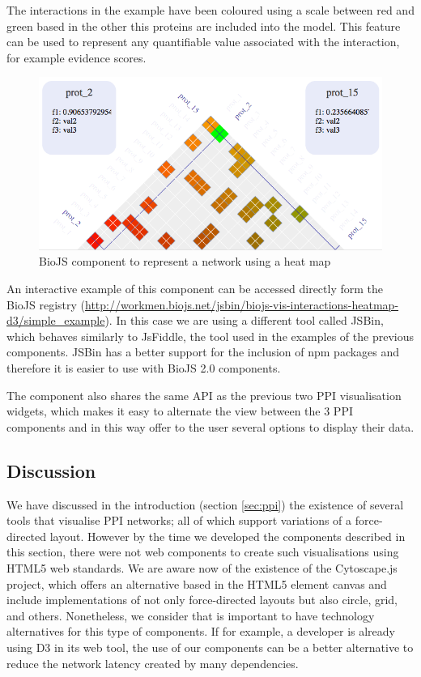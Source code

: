 The interactions in the example have been coloured using a scale between red and green based in the other this proteins are included into the model. This feature can be used to represent any quantifiable value associated with the interaction, for example evidence scores.

\begin{figure}[ht]
\centering
\includegraphics[width=\textwidth]{figures/heatmap.png}
\caption[BioJS component to represent a network using a heat map]{BioJS component to represent a network using a heat map
\label{fig:biojs_heatmap}}
\end{figure}

An interactive example of this component can be accessed directly form the BioJS registry (\url{http://workmen.biojs.net/jsbin/biojs-vis-interactions-heatmap-d3/simple_example}). In this case we are using a different tool called JSBin, which behaves similarly to JsFiddle, the tool used in the examples of the previous components. JSBin has a better support for the inclusion of npm packages and therefore it is easier to use with BioJS 2.0 components.

The component also shares the same API as the previous two PPI visualisation widgets, which makes it easy to alternate the view between the 3 PPI components and in this way offer to the user several options to display their data.


\subsection{Discussion}
We have discussed in the introduction (section \ref{sec:ppi}) the existence of several tools that visualise PPI networks; all of which support variations of a force-directed layout. However by the time we developed the components described in this section, there were not web components to create such visualisations using HTML5 web standards. We are aware now of the existence of the Cytoscape.js project, which offers an alternative based in the HTML5 element canvas and include implementations of not only force-directed layouts but also circle, grid, and others. Nonetheless, we consider that is important to have technology alternatives  for this type of components. If for example, a developer is already using D3 in its web tool, the use of our components can be a better alternative to reduce the network latency created by many dependencies.


